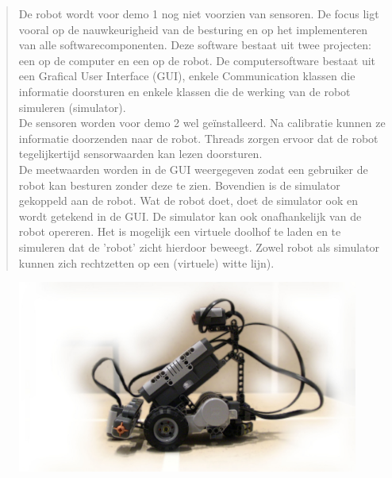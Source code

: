 \documentclass[tt3]{penoverslag}
\begin{document}

\maketitlepage

\begin{abstract}
\label{ssec:abstr} %
De robot wordt voor demo 1 nog niet voorzien van sensoren. De focus ligt vooral op de nauwkeurigheid van de besturing en op het implementeren van alle softwarecomponenten. Deze software bestaat uit twee projecten: een op de computer en een op de robot. De computersoftware bestaat uit een Grafical User Interface (GUI), enkele Communication klassen die informatie doorsturen en enkele klassen die de werking van de robot simuleren (simulator).\\
De sensoren worden voor demo 2 wel geïnstalleerd. Na calibratie kunnen ze informatie doorzenden naar de robot. Threads zorgen ervoor dat de robot tegelijkertijd sensorwaarden kan lezen doorsturen.\\
De meetwaarden worden in de GUI weergegeven zodat een gebruiker de robot kan besturen zonder deze te zien. Bovendien is de simulator gekoppeld aan de robot. Wat de robot doet, doet de simulator ook en wordt getekend in de GUI. De simulator kan ook onafhankelijk van de robot opereren. Het is mogelijk een virtuele doolhof te laden en te simuleren dat de 'robot' zicht hierdoor beweegt. Zowel robot als simulator kunnen zich rechtzetten op een (virtuele) witte lijn).

\end{abstract}

\tableofcontents

\begin{figure}[!hb]
\begin{flushright}
    \includegraphics[width=1\textwidth]{robotFP2}
    \label{fig:robotFP}
\end{flushright}
\end{figure}
\end{document}
